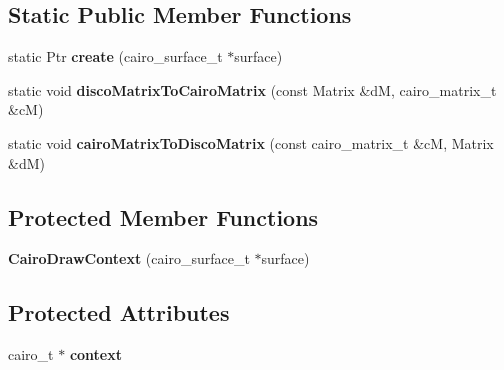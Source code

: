 \subsection*{Static Public Member Functions}
\begin{DoxyCompactItemize}
\item 
\hypertarget{classsambag_1_1disco_1_1_cairo_draw_context_a795a1f519067c93494b37fa8b979a8e1}{
static Ptr {\bfseries create} (cairo\_\-surface\_\-t $\ast$surface)}
\label{classsambag_1_1disco_1_1_cairo_draw_context_a795a1f519067c93494b37fa8b979a8e1}

\item 
\hypertarget{classsambag_1_1disco_1_1_cairo_draw_context_a4af32bfab821439bb98b63d05013a8f0}{
static void {\bfseries discoMatrixToCairoMatrix} (const Matrix \&dM, cairo\_\-matrix\_\-t \&cM)}
\label{classsambag_1_1disco_1_1_cairo_draw_context_a4af32bfab821439bb98b63d05013a8f0}

\item 
\hypertarget{classsambag_1_1disco_1_1_cairo_draw_context_a5f68c203cfc20e95e8a7cb1b81f4b986}{
static void {\bfseries cairoMatrixToDiscoMatrix} (const cairo\_\-matrix\_\-t \&cM, Matrix \&dM)}
\label{classsambag_1_1disco_1_1_cairo_draw_context_a5f68c203cfc20e95e8a7cb1b81f4b986}

\end{DoxyCompactItemize}
\subsection*{Protected Member Functions}
\begin{DoxyCompactItemize}
\item 
\hypertarget{classsambag_1_1disco_1_1_cairo_draw_context_ab8e541f8702af3fc3fe794f4d4ae34a7}{
{\bfseries CairoDrawContext} (cairo\_\-surface\_\-t $\ast$surface)}
\label{classsambag_1_1disco_1_1_cairo_draw_context_ab8e541f8702af3fc3fe794f4d4ae34a7}

\end{DoxyCompactItemize}
\subsection*{Protected Attributes}
\begin{DoxyCompactItemize}
\item 
\hypertarget{classsambag_1_1disco_1_1_cairo_draw_context_ae9ecc565b92d85754e56013e6955f368}{
cairo\_\-t $\ast$ {\bfseries context}}
\label{classsambag_1_1disco_1_1_cairo_draw_context_ae9ecc565b92d85754e56013e6955f368}

\end{DoxyCompactItemize}


